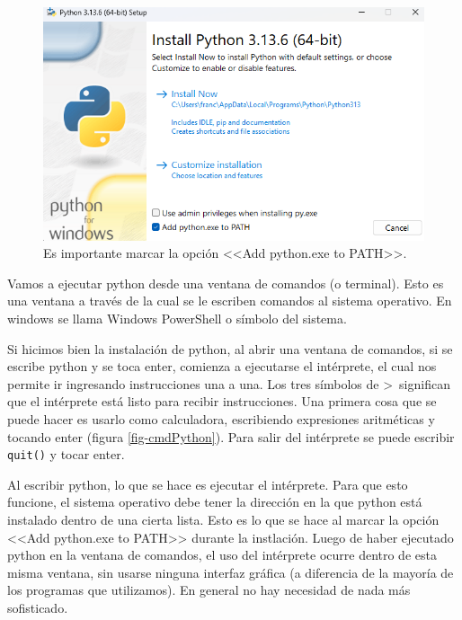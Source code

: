 \documentclass[a4paper, 12pt]{report}
\theoremstyle{definition}
\begin{document}
\begin{figure}
	\centering
	\includegraphics[scale=0.5]{InstallPython.png}
	\caption{Es importante marcar la opción <<Add python.exe to PATH>>.}
	\label{fig-InstallPython}
\end{figure}

Vamos a ejecutar python desde una ventana de comandos (o terminal). Esto es una ventana a través de la cual se le escriben comandos al sistema operativo. En windows se llama Windows PowerShell o símbolo del sistema.

Si hicimos bien la instalación de python, al abrir una ventana de comandos, si se escribe python y se toca enter, comienza a ejecutarse el intérprete, el cual nos permite ir ingresando instrucciones una a una. Los tres símbolos de >~significan que el intérprete está listo para recibir instrucciones. Una primera cosa que se puede hacer es usarlo como calculadora, escribiendo expresiones aritméticas y tocando enter (figura \ref{fig-cmdPython}). Para salir del intérprete se puede escribir {\tt quit()} y tocar enter.

Al escribir python, lo que se hace es ejecutar el intérprete. Para que esto funcione, el sistema operativo debe tener la dirección en la que python está instalado dentro de una cierta lista. Esto es lo que se hace al marcar la opción <<Add python.exe to PATH>> durante la instlación. Luego de haber ejecutado python en la ventana de comandos, el uso del intérprete ocurre dentro de esta misma ventana, sin usarse ninguna interfaz gráfica (a diferencia de la mayoría de los programas que utilizamos). En general no hay necesidad de nada más sofisticado.
\end{document}
